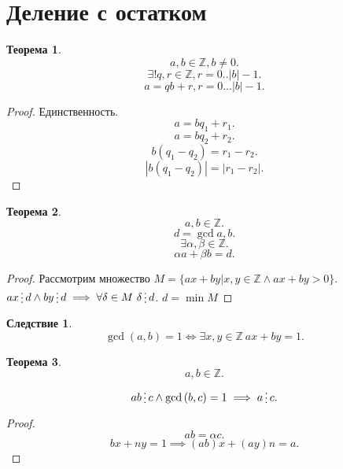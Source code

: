 \documentclass{scrarticle}
\newtheorem{theorem}{Теорема}
\newtheorem{corollary}{Следствие}[theorem]
\newcommand{\divisible}{\mathop{\raisebox{-2pt}{\vdots}}}
\begin{document}
    \section{Деление с остатком}
    \begin{theorem}
        \[
            a ,b \in \mathbb{Z}, b \neq 0
        .\] 
        \[
            \exists! q , r \in \mathbb{Z}, r = 0.. |b| - 1
        .\] 
        \[
            a = qb + r, r = 0\dots |b| -1
        .\] 
    \end{theorem}
    \begin{proof}
       Единственность.
       \[
       a = b q_1 + r_1
       .\] 
       \[
       a = b q_2 + r_2
       .\] 
       \[
           b(q_1 - q_2) = r_1 - r_2
       .\] 
       \[
       |b (q_1 - q_2) | = |r_1 - r_2|
       .\] 
    \end{proof}
    \begin{theorem}
        \[
        a , b \in \mathbb{Z}
        .\] 
        \[
            d = \gcd{a,b}
        .\] 
        \[
        \exists  \alpha , \beta \in \mathbb{Z}
        .\] 
        \[
        \alpha a + \beta b = d
        .\] 
    \end{theorem}
    \begin{proof}
        Рассмотрим множество $ M  = \{ax + by | x,y \in \mathbb{Z} \land ax + by > 0 \}$. $ax \divisible d \land by \divisible d \implies \forall \delta \in M ~ \delta \divisible d$. $d = \min{M}$
    \end{proof}
    \begin{corollary}
        \[
            \gcd{(a,b)} = 1 \iff \exists x,y \in \mathbb{Z} ~  ax + by = 1
        .\] 
    \end{corollary}
    \begin{theorem} \label{11}
        \[
        a , b \in \mathbb{Z}
        .\] 
        \[
            ab \divisible c \land \gcd{(b,c)} = 1 \implies a \divisible c
        .\] 
    \end{theorem}
    \begin{proof}
        \[
        ab = \alpha c
        .\] 
        \[
        bx + ny = 1 \implies ( ab )x + (ay)n = a 
        .\] 
    \end{proof}
\end{document}
